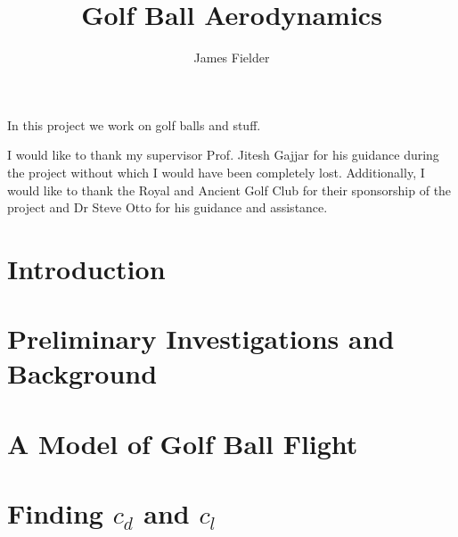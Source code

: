 \documentclass[12pt,MSc,twoside]{muthesis}
\numberwithin{equation}{section}
\begin{document}
\title{Golf Ball Aerodynamics}
\author{James Fielder}
\def\wordcount{xxxxx}




\beforeabstract

In this project we work on golf balls and stuff.

\afterabstract

I would like to thank my supervisor Prof. Jitesh Gajjar for his guidance during the project without 
which I would have been completely lost. Additionally, I would like to thank the Royal and Ancient 
Golf Club for their sponsorship of the project and Dr Steve Otto for his guidance and assistance.

\afterpreface


\pagestyle{normal}
\chapter{Introduction}


\chapter{Preliminary Investigations and Background}


\chapter{A Model of Golf Ball Flight}


\chapter{Finding $c_{d}$ and $c_{l}$}

\end{document}
